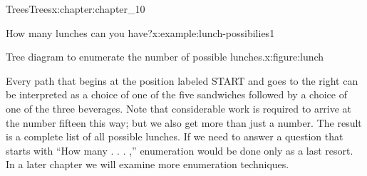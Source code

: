 \documentclass[oneside,10pt,]{book}
\numberwithin{equation}{section}
\begin{document}
\begin{chapterptx}{Trees}{}{Trees}{}{}{x:chapter:chapter_10}
\begin{example}{How many lunches can you have?}{x:example:lunch-possibilies1}
\begin{figureptx}{Tree diagram to enumerate the number of possible lunches.}{x:figure:lunch}{}
\begin{image}{0.25}{0.5}{0.25}
\end{image}%
\tcblower
\end{figureptx}%
Every path that begins at the position labeled START and goes to the right can be interpreted as a choice of one of the five sandwiches followed by a choice of one of the three beverages. Note that considerable work is required to arrive at the number fifteen this way; but we also get more than just a number. The result is a complete list of all possible lunches. If we need to answer a question that starts with ``How many . . . ,'' enumeration would be done only as a last resort. In a later chapter we will examine more enumeration techniques.%
\end{example}
\end{chapterptx}
%
%
\typeout{************************************************}
\typeout{************************************************}
%
\end{document}

